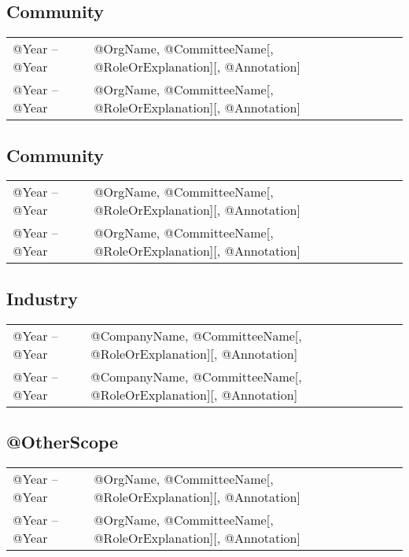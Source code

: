 \documentclass[10pt]{article}
\begin{document}
\begin{IOWA ONLY}
\subsection*{Community}

\begin{tabular}{l@{\quad\ }p{34em}} 
 @Year -- @Year 
 & @OrgName, @CommitteeName[, @RoleOrExplanation][, @Annotation]
 \\[.5ex]
 @Year -- @Year 
 & @OrgName, @CommitteeName[, @RoleOrExplanation][, @Annotation]
\end{tabular}

\subsection*{Community}

\begin{tabular}{l@{\quad\ }p{34em}} 
 @Year -- @Year 
 & @OrgName, @CommitteeName[, @RoleOrExplanation][, @Annotation]
 \\[.5ex]
 @Year -- @Year 
 & @OrgName, @CommitteeName[, @RoleOrExplanation][, @Annotation]
\end{tabular}

\subsection*{Industry}

\begin{tabular}{l@{\quad\ }p{34em}} 
 @Year -- @Year 
 & @CompanyName, @CommitteeName[, @RoleOrExplanation][, @Annotation]
 \\[.5ex]
 @Year -- @Year 
 & @CompanyName, @CommitteeName[, @RoleOrExplanation][, @Annotation]
\end{tabular}

\subsection*{@OtherScope}

\begin{tabular}{l@{\quad\ }p{34em}} 
 @Year -- @Year 
 & @OrgName, @CommitteeName[, @RoleOrExplanation][, @Annotation]
 \\[.5ex]
 @Year -- @Year 
 & @OrgName, @CommitteeName[, @RoleOrExplanation][, @Annotation]
\end{tabular}


\end{IOWA ONLY}
\end{document}
